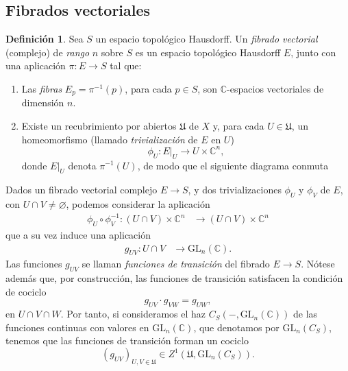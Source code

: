 \documentclass[12pt,a4paper]{article}
\theoremstyle{definition} \newtheorem{defn}[thm]{Definición}
\theoremstyle{definition} \newtheorem{ejemplo}[thm]{Ejemplo}
\theoremstyle{definition} \newtheorem{ejercicio}[thm]{Ejercicio}
\def\CC{\mathbb{C}}
\def\UU{\mathfrak{U}}
\def\GL{\mathrm{GL}}
\DeclareMathOperator{\pr}{pr}
\begin{document}
      \subsection{Fibrados vectoriales}
      \begin{defn}
	Sea $S$ un espacio topológico Hausdorff. Un \emph{fibrado vectorial} (complejo) de \emph{rango} $n$ sobre $S$ es un espacio topológico Hausdorff $E$, junto con una aplicación $\pi:E\rightarrow S$ tal que:
	\begin{enumerate}
	  \item Las \emph{fibras} $E_p=\pi^{-1}(p)$, para cada $p\in S$, son $\CC$-espacios vectoriales de dimensión $n$.
	  \item Existe un recubrimiento por abiertos $\UU$ de $X$ y, para cada $U\in \UU$, un homeomorfismo (llamado \emph{trivialización} de $E$ en $U$)
	    \begin{equation*}
	      \phi_U: E|_U \longrightarrow U \times \CC^n,
	    \end{equation*}
	    donde $E|_U$ denota $\pi^{-1}(U)$, de modo que el siguiente diagrama conmuta
	    \begin{center}
	    \end{center}
	\end{enumerate}
      \end{defn}

      Dados un fibrado vectorial complejo $E\rightarrow S$, y dos trivializaciones $\phi_U$ y $\phi_V$ de $E$, con $U\cap V \neq \varnothing$, podemos considerar la aplicación
      \begin{align*}
	\phi_U \circ \phi_V^{-1} :(U\cap V) \times \CC^n &\longrightarrow (U\cap V) \times \CC^n
	\end{align*}
	que a su vez induce una aplicación
	\begin{align*}
	  g_{UV}: U\cap V &\longrightarrow \GL_n(\CC) .
	  \end{align*}
	  Las funciones $g_{UV}$ se llaman \emph{funciones de transición} del fibrado $E\rightarrow S$. Nótese además que, por construcción, las funciones de transición satisfacen la condición de cociclo
	  \begin{equation*}
	    g_{UV} \cdot g_{VW} = g_{UW},
	  \end{equation*}
	  en $U\cap V \cap W$. Por tanto, si consideramos el haz $C_S(-,\GL_n(\CC))$ de las funciones continuas con valores en $\GL_n(\CC)$, que denotamos por $\GL_n(C_S)$, tenemos que las funciones de transición forman un cociclo
	  \begin{equation*}
	    (g_{UV})_{U,V \in \UU} \in Z^1(\UU,\GL_n(C_S)).
	  \end{equation*}
\end{document}
